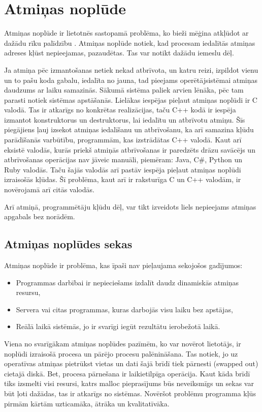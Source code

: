 ﻿\section{Atmiņas noplūde}


Atmiņas noplūde ir lietotnēs sastopamā problēma, ko bieži mēģina atkļūdot ar dažādu rīku palīdzību \cite{PUG, VAL}. 
Atmiņas noplūde notiek, kad procesam iedalītās atmiņas adreses kļūst nepieejamas, pazaudētas.
Tas var notikt dažādu iemeslu dēļ. 


Ja atmiņa pēc izmantošanas netiek nekad atbrīvota, un katru reizi, izpildot vienu un to pašu koda gabalu, iedalīta no jauna, tad pieejams operētājsistēmai atmiņas daudzums ar laiku samazinās.
Sākumā sistēma paliek arvien lēnāka, pēc tam parasti notiek sistēmas apstāšanās.
Lielākas iespējas pieļaut atmiņas noplūdi ir C valodā. 
Tas ir atkarīgs no konkrētas realizācijas, taču C++ kodā ir iespēja izmantot konstruktorus un destruktorus, lai iedalītu un atbrīvotu atmiņu.
Šīs piegājiens ļauj izsekot atmiņas iedalīšanu un atbrīvošanu, ka arī samazina kļūdu parādīšanās varbūtību, programmām, kas izstrādātas C++ valodā.
Kaut arī eksistē valodās, kurās priekš atmiņās atbrīvošanas ir paredzēts drāzu savācējs un atbrīvošanas operācijas nav jāveic manuāli, piemēram: Java, C\#, Python un Ruby valodās. 
Taču šajās valodās arī pastāv iespēja pieļaut atmiņas noplūdi izraisošās kļūdas. Šī problēma, kaut arī ir raksturīga C un C++ valodām, ir novērojamā arī citās valodās.

Arī atmiņā, programmētāju kļūdu dēļ, var tikt izveidots liels nepieejams atmiņas apgabals bez norādēm.

\subsection{Atmiņas noplūdes sekas}

Atmiņas noplūde ir problēma, kas īpaši nav pieļaujama sekojošos gadījumos: 
 
\begin{itemize}
\item { Programmas darbībai ir nepieciešams izdalīt daudz dinamiskās atmiņas resursu, }
\item { Servera vai citas programmas, kuras darbojās visu laiku bez apstājas, }
\item { Reālā laikā sistēmās, jo ir svarīgi iegūt rezultātu ierobežotā laikā. }
\end{itemize}

Viena no svarīgākam atmiņas noplūdes pazīmēm, ko var novērot lietotājs, ir noplūdi izraisošā procesa un pārējo procesu palēnināšana. 
Tas notiek, jo uz operatīvas atmiņas pietrūkst vietas un dati šajā brīdī tiek pārnesti (swapped out) cietajā diskā.
Bet, procesa pārnešana ir laikietilpīga operācija. 
Kaut kāda brīdī tiks izsmelti visi resursi, katrs malloc pieprasījums būs neveiksmīgs un sekas var būt ļoti dažādas, tas ir atkarīgs no sistēmas. 
Novēršot problēmu programma kļūs pirmām kārtām uzticamāka, ātrāka un kvalitatīvāka.

